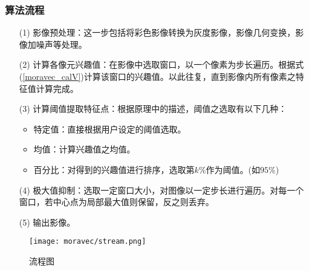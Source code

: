     \subsubsection{算法流程}
        \begin{enumerate}
            \item [(1)]影像预处理：这一步包括将彩色影像转换为灰度影像，影像几何变换，影像加噪声等处理。
            \item [(2)]计算各像元兴趣值：在影像中选取窗口，以一个像素为步长遍历。根据式(\ref{moravec_calV})计算该窗口的兴趣值。以此往复，直到影像内所有像素之特征值计算完成。
            \item [(3)]计算阈值提取特征点：根据原理中的描述，阈值之选取有以下几种：
                \begin{itemize}
                    \item 特定值：直接根据用户设定的阈值选取。
                    \item 均值：计算兴趣值之均值。
                    \item 百分比：对得到的兴趣值进行排序，选取第$k\%$作为阈值。(如$95\%$)
                \end{itemize}
            \item [(4)]极大值抑制：选取一定窗口大小，对图像以一定步长进行遍历。对每一个窗口，若中心点为局部最大值则保留，反之则丢弃。
            \item [(5)]输出影像。
        \end{enumerate}

        \begin{figure}[H]
            \centering 
            \texttt{[image: moravec/stream.png]}
            \caption{流程图}
            \label{moravec_stream}
        \end{figure}

